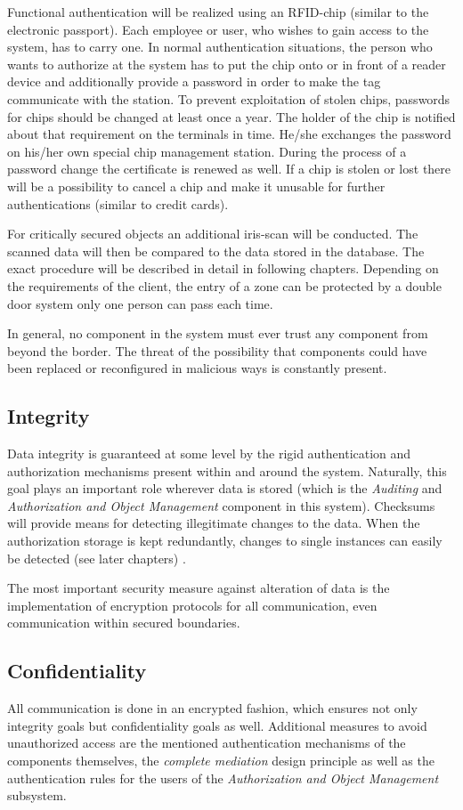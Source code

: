 \documentclass[12pt,a4paper,titlepage,oneside]{scrartcl}
\begin{document}
Functional authentication will be realized using an RFID-chip (similar to the electronic passport). Each employee or user, who wishes to gain access to the system, has to carry one. In normal authentication situations, the person who wants to authorize at the system has to put the chip onto or in front of a reader device and additionally provide a password in order to make the tag communicate with the station. To prevent exploitation of stolen chips, passwords for chips should be changed at least once a year. The holder of the chip is notified about that requirement  on the terminals in time. He/she exchanges the password on his/her own special chip management station. During the process of a password change the certificate is renewed as well. If a chip is stolen or lost there will be a possibility to cancel a chip and make it unusable for further authentications (similar to credit cards).

For critically secured objects an additional iris-scan will be conducted. The scanned data will then be compared to the data stored in the database. The exact procedure will be described in detail in following chapters. Depending on the requirements of the client, the entry of a zone can be protected by a double door system only one person can pass each time.

In general, no component in the system must ever trust any component from beyond the border. The threat of the possibility that components could have been replaced or reconfigured in malicious ways is constantly present.

\subsection{Integrity}
Data integrity is guaranteed at some level by the rigid authentication and authorization mechanisms present within and around the system. Naturally, this goal plays an important role wherever data is stored (which is the \emph{Auditing} and \emph{Authorization and Object Management} component in this system). Checksums will provide means for detecting illegitimate changes to the data. When the authorization storage is kept redundantly, changes to single instances can easily be detected  (see later chapters) .

The most important security measure against alteration of data is the implementation of encryption protocols for all communication, even communication within secured boundaries.

\subsection{Confidentiality}
All communication is done in an encrypted fashion, which ensures not only integrity goals but confidentiality goals as well. Additional measures to avoid unauthorized access are the mentioned authentication mechanisms of the components themselves, the \emph{complete mediation} design principle as well as the authentication rules for the users of the \emph{Authorization and Object Management} subsystem.
\end{document}
